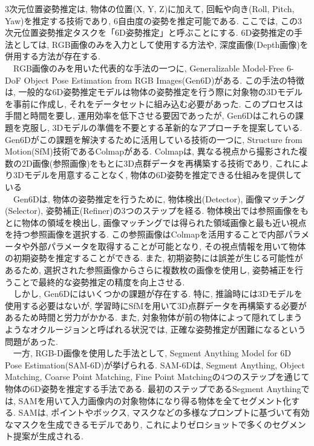 3次元位置姿勢推定は, 物体の位置(X, Y, Z)に加えて, 回転や向き(Roll, Pitch, Yaw)を推定する技術であり, 6自由度の姿勢を推定可能である. 
ここでは, この3次元位置姿勢推定タスクを「6D姿勢推定」と呼ぶことにする. 
6D姿勢推定の手法としては, RGB画像のみを入力として使用する方法や, 深度画像(Depth画像)を併用する方法が存在する. \\
　RGB画像のみを用いた代表的な手法の一つに, Generalizable Model-Free 6-DoF Object Pose Estimation from RGB Images(Gen6D)がある\cite{bib:15}. 
この手法の特徴は, 一般的な6D姿勢推定モデルは物体の姿勢推定を行う際に対象物の3Dモデルを事前に作成し, それをデータセットに組み込む必要があった. 
このプロセスは手間と時間を要し, 運用効率を低下させる要因であったが, Gen6Dはこれらの課題を克服し, 3Dモデルの準備を不要とする革新的なアプローチを提案している. 
Gen6Dがこの課題を解決するために活用している技術の一つに, Structure from Motion(SfM)技術であるColmapがある\cite{bib:16}. 
Colmapは, 異なる視点から撮影された複数の2D画像(参照画像)をもとに3D点群データを再構築する技術であり, これにより3Dモデルを用意することなく, 物体の6D姿勢を推定できる仕組みを提供している\\
　Gen6Dは, 物体の姿勢推定を行うために, 物体検出(Detector), 画像マッチング(Selector), 姿勢補正(Refiner)の3つのステップを経る. 
物体検出では参照画像をもとに物体の領域を検出し, 画像マッチングでは得られた領域画像と最も近い視点を持つ参照画像を選択する. 
この参照画像はColmapを活用することで内部パラメータや外部パラメータを取得することが可能となり, その視点情報を用いて物体の初期姿勢を推定することができる. 
また, 初期姿勢には誤差が生じる可能性があるため, 選択された参照画像からさらに複数枚の画像を使用し, 姿勢補正を行うことで最終的な姿勢推定の精度を向上させる. \\
　しかし, Gen6Dにはいくつかの課題が存在する. 
特に, 推論時には3Dモデルを使用する必要はないが, 学習時にSfMを用いて3D点群データを再構築する必要があるため時間と労力がかかる. 
また, 対象物体が前の物体によって隠れてしまうようなオクルージョンと呼ばれる状況では, 正確な姿勢推定が困難になるという問題があった. \\
　一方, RGB-D画像を使用した手法として, Segment Anything Model for 6D Pose Estimation(SAM-6D)が挙げられる\cite{bib:17}. 
SAM-6Dは, Segment Anything, Object Matching, Coarse Point Matching, Fine Point Matchingの4つのステップを通じて物体の6D姿勢を推定する手法である. 
最初のステップであるSegment Anythingでは, SAMを用いて入力画像内の対象物体になり得る物体を全てセグメント化する\cite{bib:18}. 
SAMは, ポイントやボックス, マスクなどの多様なプロンプトに基づいて有効なマスクを生成できるモデルであり, これによりゼロショットで多くのセグメント提案が生成される. 
